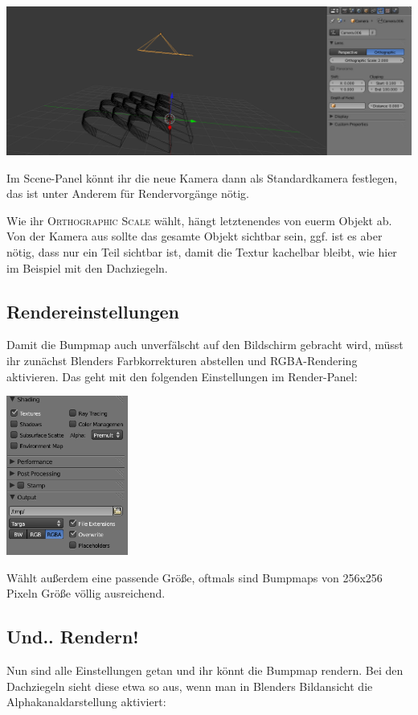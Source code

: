 \documentclass[a4paper]{article}
\newcommand{\ccaption}[1]{\textsc{#1}}
\begin{document}
\begin{center}
\includegraphics[width=150mm]{../images/blender/bumpmap-camera.png}
\end{center}

Im Scene-Panel könnt ihr die neue Kamera dann als Standardkamera festlegen, das ist unter Anderem für Rendervorgänge nötig.

Wie ihr \ccaption{Orthographic Scale} wählt, hängt letztenendes von euerm Objekt ab. Von der Kamera aus sollte das gesamte Objekt sichtbar sein,
ggf. ist es aber nötig, dass nur ein Teil sichtbar ist, damit die Textur kachelbar bleibt, wie hier im Beispiel mit den Dachziegeln.

\subsection{Rendereinstellungen}
Damit die Bumpmap auch unverfälscht auf den Bildschirm gebracht wird, müsst ihr zunächst Blenders Farbkorrekturen abstellen und RGBA-Rendering aktivieren.
Das geht mit den folgenden Einstellungen im Render-Panel:

\begin{center}
\includegraphics[width=40mm]{../images/blender/bumpmap-render.png}
\end{center}

Wählt außerdem eine passende Größe, oftmals sind Bumpmaps von 256x256 Pixeln Größe völlig ausreichend.

\subsection{Und.. Rendern!}
Nun sind alle Einstellungen getan und ihr könnt die Bumpmap rendern. Bei den Dachziegeln sieht diese etwa so aus, wenn man in Blenders Bildansicht
die Alphakanaldarstellung aktiviert:
\end{document}
